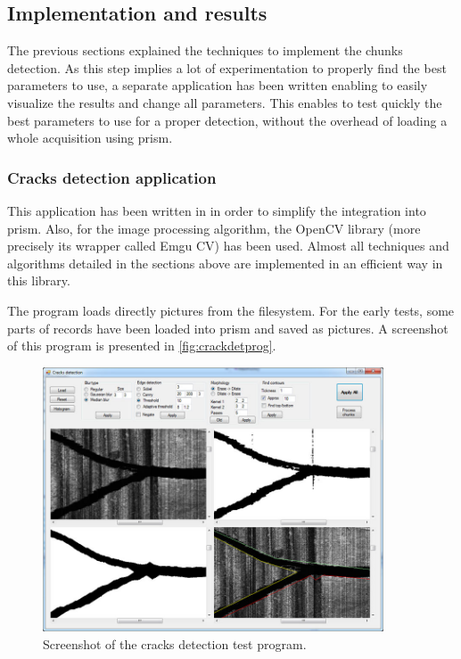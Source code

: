 \subsection{Implementation and results}

The previous sections explained the techniques to implement the chunks detection. As this step implies a lot of experimentation to properly find the best parameters to use, a separate application has been written enabling to easily visualize the results and change all parameters. This enables to test quickly the best parameters to use for a proper detection, without the overhead of loading a whole acquisition using \gls{prism}.

\subsubsection{Cracks detection application}

This application has been written in \Csh{} in order to simplify the integration into \gls{prism}. Also, for the image processing algorithm, the OpenCV library (more precisely its \Csh wrapper called Emgu CV) has been used. Almost all techniques and algorithms detailed in the sections above are implemented in an efficient way in this library.

The program loads directly pictures from the filesystem. For the early tests, some parts of records have been loaded into \gls{prism} and saved as pictures. A screenshot of this program is presented in \autoref{fig:crackdetprog}.

\begin{figure}[!ht]
\centering
\includegraphics[width=0.9\textwidth]{images/crack-test-prog}
\caption{Screenshot of the cracks detection test program.}
\label{fig:crackdetprog}
\end{figure}

